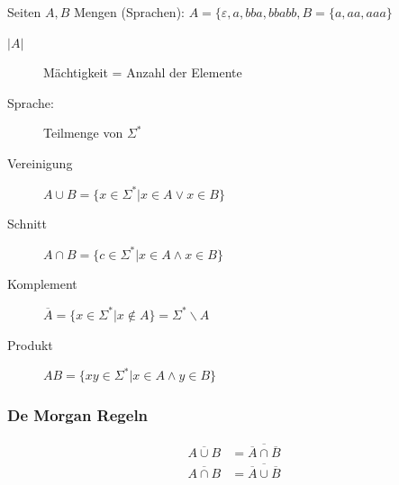 \documentclass{scrartcl}
\begin{document}
Seiten $A,B$ Mengen (Sprachen): {\tiny $A=\{\varepsilon, a, bba, bbabb, B=\{a,aa,aaa\}$}
\begin{description}
    \item[$|A|$] Mächtigkeit = Anzahl der Elemente
    \item[Sprache:] Teilmenge von $\Sigma^*$
    \item[Vereinigung] $A\cup B=\{x\in\Sigma^* | x\in A \vee x\in B\}$
    \item[Schnitt] $A\cap B=\{c\in\Sigma^* | x\in A \wedge x\in B\}$
    \item[Komplement] $\overline{A}=\{x\in\Sigma^* | x \not\in A\} = \Sigma^*\backslash A$
    \item[Produkt] $AB=\{xy\in\Sigma^* | x\in A \wedge y\in B\}$
\end{description}

\subsubsection*{De Morgan Regeln}
\begin{align*}
\overline{A \cup B} &= \overline{\overline{A}\cap \overline{B}} \\
\overline{A\cap B} &= \overline{\overline{A} \cup \overline{B}}
\end{align*}
\end{document}
